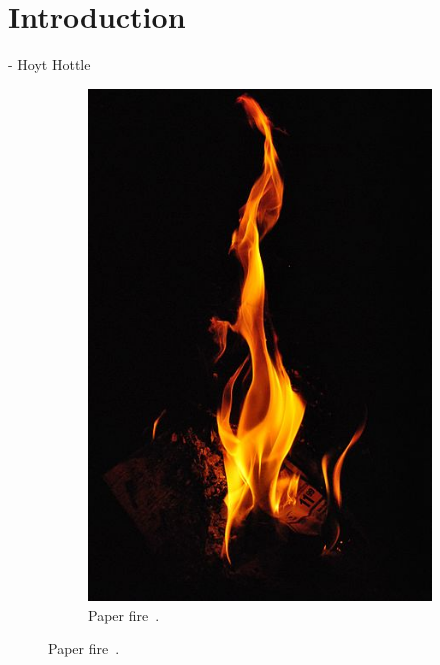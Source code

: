 \chapter{Introduction}
\label{ch:introduction}
 - Hoyt Hottle

\begin{figure}[htpb!]
        \centering
        \begin{subfigure}[t]{0.25\textwidth}
                \includegraphics[width=\textwidth]{img/real_fire1}
                \caption{Paper fire~\cite{real_fire1}.}
                \label{fig:real_fire1}
        \end{subfigure}%

\end{figure}

